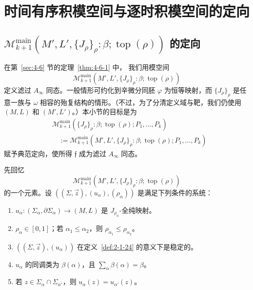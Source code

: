 
\section{时间有序积模空间与逐时积模空间的定向}
\label{sec:8-9}

\subsection{\texorpdfstring{$\mathcal M_{k+1}^{\mathrm{main}}
(M',L',\{J_\rho\}_\rho:\beta;\operatorname{top}(\rho))$ 的定向}%
{top 模空间的定向}}
\label{subsec:8-9-1}

在第~\ref{sec:4-6} 节的定理~\ref{thm:4-6-1} 中，
我们用模空间
\[
 \mathcal M_{k+1}^{\mathrm{main}}
 (M',L',\{J_\rho\}_\rho:\beta;\operatorname{top}(\rho))
\]
定义滤过 $A_\infty$ 同态。一般情形可约化到辛微分同胚
$\varphi$ 为恒等映射，而 $\{J_\rho\}_\rho$ 是任意一族与
$\omega$ 相容的殆复结构的情形。（不过，为了分清定义域与靶，我们仍使用
$(M,L)$ 和 $(M',L')$。）本小节的目标是为
\[
\begin{aligned}
 &\mathcal M_{k+1}^{\mathrm{main}}
 (\{J_\rho\}_\rho:\beta;\operatorname{top}(\rho);P_1,\ldots,P_k)\\
 &\quad:=
 \mathcal M_{k+1}^{\mathrm{main}}
 (M',L',\{J_\rho\}_\rho:\beta;
  \operatorname{top}(\rho);P_1,\ldots,P_k)
\end{aligned}
\]
赋予典范定向，使所得 $\mathfrak f$ 成为滤过 $A_\infty$ 同态。

先回忆
\[
 \mathcal M_{k+1}^{\mathrm{main}}
 (M',L',\{J_\rho\}_\rho:\beta;\operatorname{top}(\rho))
\]
的一个元素。设 $((\Sigma,\vec z),(u_\alpha),(\rho_\alpha))$
是满足下列条件的系统：
\begin{enumerate}[label=\textup{(4.6.7.\arabic*)},leftmargin=5.9em]
\item
$u_\alpha\colon(\Sigma_\alpha,\partial\Sigma_\alpha)\to(M,L)$
是 $J_{\rho_\alpha}$-全纯映射。
\item
$\rho_\alpha\in[0,1]$；若 $\alpha_1\leq\alpha_2$，则
$\rho_{\alpha_1}\leq\rho_{\alpha_2}$。
\item
$((\Sigma,\vec z),(u_\alpha))$ 在定义~\ref{def:2-1-24}
的意义下是稳定的。
\item
$u_\alpha$ 的同调类为 $\beta(\alpha)$，且
$\sum_\alpha\beta(\alpha)=\beta$。
\item
若 $z\in\Sigma_\alpha\cap\Sigma_{\alpha'}$，则
$u_\alpha(z)=u_{\alpha'}(z)$。
\end{enumerate}

